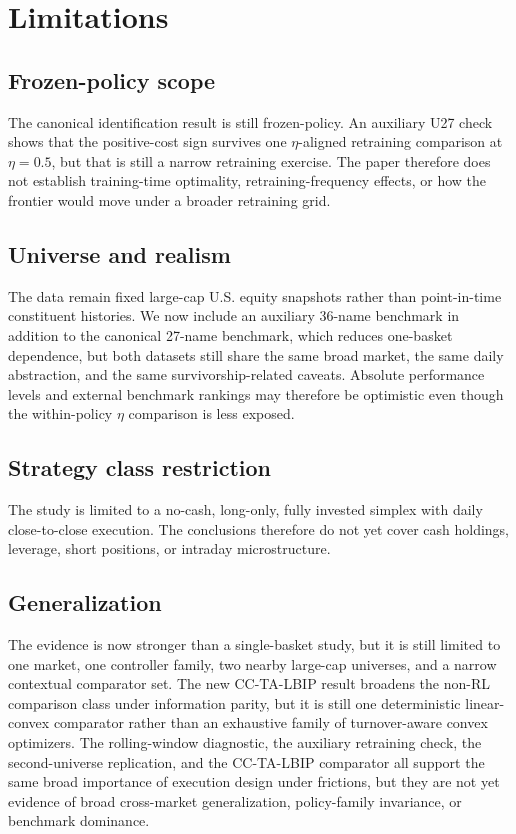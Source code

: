 \documentclass[10pt,twocolumn]{article}
\begin{document}
\section{Limitations}
\subsection{Frozen-policy scope}
The canonical identification result is still frozen-policy. An auxiliary U27 check shows that the positive-cost sign survives one $\eta$-aligned retraining comparison at $\eta=0.5$, but that is still a narrow retraining exercise. The paper therefore does not establish training-time optimality, retraining-frequency effects, or how the frontier would move under a broader retraining grid.

\subsection{Universe and realism}
The data remain fixed large-cap U.S. equity snapshots rather than point-in-time constituent histories. We now include an auxiliary 36-name benchmark in addition to the canonical 27-name benchmark, which reduces one-basket dependence, but both datasets still share the same broad market, the same daily abstraction, and the same survivorship-related caveats. Absolute performance levels and external benchmark rankings may therefore be optimistic even though the within-policy $\eta$ comparison is less exposed.

\subsection{Strategy class restriction}
The study is limited to a no-cash, long-only, fully invested simplex with daily close-to-close execution. The conclusions therefore do not yet cover cash holdings, leverage, short positions, or intraday microstructure.

\subsection{Generalization}
The evidence is now stronger than a single-basket study, but it is still limited to one market, one controller family, two nearby large-cap universes, and a narrow contextual comparator set. The new CC-TA-LBIP result broadens the non-RL comparison class under information parity, but it is still one deterministic linear-convex comparator rather than an exhaustive family of turnover-aware convex optimizers. The rolling-window diagnostic, the auxiliary retraining check, the second-universe replication, and the CC-TA-LBIP comparator all support the same broad importance of execution design under frictions, but they are not yet evidence of broad cross-market generalization, policy-family invariance, or benchmark dominance.
\end{document}
